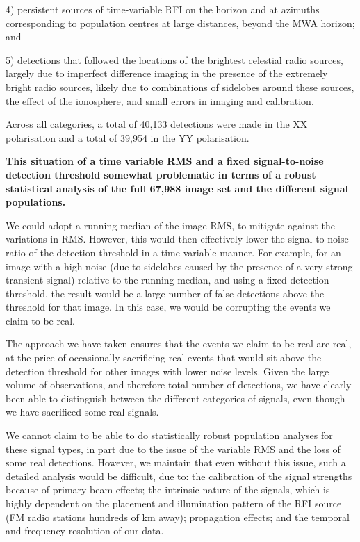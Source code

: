 4) persistent sources of time-variable RFI on the horizon and at azimuths corresponding to population centres at large distances, beyond the MWA horizon; and

5) detections that followed the locations of the brightest celestial radio sources, largely due to imperfect difference imaging in the presence of the extremely bright radio sources, likely due to combinations of sidelobes around these sources, the effect of the ionosphere, and small errors in imaging and calibration.  

Across all categories, a total of 40,133 detections were made in the XX polarisation and a total of 39,954 in the YY polarisation.

{\bfseries This situation of a time variable RMS and a fixed signal-to-noise detection threshold somewhat problematic in terms of a robust statistical analysis of the full 67,988 image set and the different signal populations.

We could adopt a running median of the image RMS, to mitigate against the variations in RMS.  However, this would then effectively lower the signal-to-noise ratio of the detection threshold in a time variable manner.  For example, for an image with a high noise (due to sidelobes caused by the presence of a very strong transient signal) relative to the running median, and using a fixed detection threshold, the result would be a large number of false detections above the threshold for that image.  In this case, we would be corrupting the events we claim to be real.

The approach we have taken ensures that the events we claim to be real are real, at the price of occasionally sacrificing real events that would sit above the detection threshold for other images with lower noise levels.  Given the large volume of observations, and therefore total number of detections, we have clearly been able to distinguish between the different categories of signals, even though we have sacrificed some real signals.

We cannot claim to be able to do statistically robust population analyses for these signal types, in part due to the issue of the variable RMS and the loss of some real detections.  However, we maintain that even without this issue, such a detailed analysis would be difficult, due to: the calibration of the signal strengths because of primary beam effects; the intrinsic nature of the signals, which is highly dependent on the placement and illumination pattern of the RFI source (FM radio stations hundreds of km away); propagation effects; and the temporal and frequency resolution of our data.}

